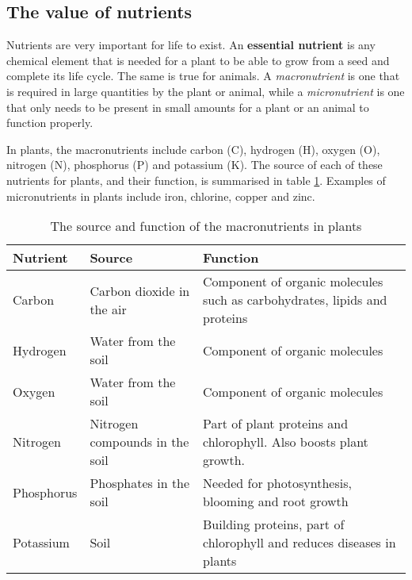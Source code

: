 \subsection{The value of nutrients}

Nutrients are very important for life to exist. An \textbf{essential nutrient} is any chemical element that is needed for a plant to be able to grow from a seed and complete its life cycle. The same is true for animals. A \textit{macronutrient} is one that is required in large quantities by the plant or animal, while a \textit{micronutrient} is one that only needs to be present in small amounts for a plant or an animal to function properly.


In plants, the macronutrients include carbon (C), hydrogen (H), oxygen (O), nitrogen (N), phosphorus (P) and potassium (K). The source of each of these nutrients for plants, and their function, is summarised in table \ref{tab:plant macronutrients}. Examples of micronutrients in plants include iron, chlorine, copper and zinc.


\begin{table}[h]
\begin{center}
\caption{The source and function of the macronutrients in plants}
\label{tab:plant macronutrients}
\begin{tabular}{|p{2.8cm}|p{3.2cm}|p{4.2cm}|}\hline
\textbf{Nutrient} & \textbf{Source} & \textbf{Function}\\\hline
Carbon & Carbon dioxide in the air & Component of organic molecules such as carbohydrates, lipids and proteins \\\hline
Hydrogen & Water from the soil & Component of organic molecules \\\hline
Oxygen & Water from the soil & Component of organic molecules \\\hline
Nitrogen & Nitrogen compounds in the soil & Part of plant proteins and chlorophyll. Also boosts plant growth. \\\hline
Phosphorus & Phosphates in the soil & Needed for photosynthesis, blooming and root growth \\\hline
Potassium & Soil & Building proteins, part of chlorophyll and reduces diseases in plants \\\hline
\end{tabular}
\end{center}
\end{table}
 
